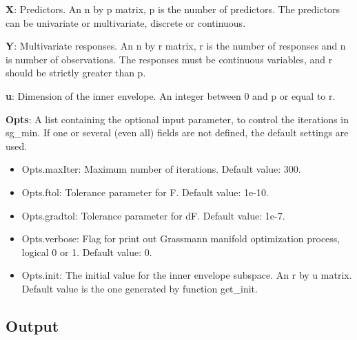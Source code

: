 \documentclass[a4paper,11pt,openany]{memoir}
\begin{document}
\begin{par}
\textbf{X}: Predictors. An n by p matrix, p is the number of predictors. The predictors can be univariate or multivariate, discrete or continuous.
\end{par} \vspace{1em}
\begin{par}
\textbf{Y}: Multivariate responses. An n by r matrix, r is the number of responses and n is number of observations. The responses must be continuous variables, and r should be strictly greater than p.
\end{par} \vspace{1em}
\begin{par}
\textbf{u}: Dimension of the inner envelope. An integer between 0 and p or equal to r.
\end{par} \vspace{1em}
\begin{par}
\textbf{Opts}: A list containing the optional input parameter, to control the iterations in sg\_min. If one or several (even all) fields are not defined, the default settings are used.
\end{par} \vspace{1em}
\begin{itemize}
\setlength{\itemsep}{-1ex}
   \item Opts.maxIter: Maximum number of iterations.  Default value: 300.
   \item Opts.ftol: Tolerance parameter for F.  Default value: 1e-10.
   \item Opts.gradtol: Tolerance parameter for dF.  Default value: 1e-7.
   \item Opts.verbose: Flag for print out Grassmann manifold optimization process, logical 0 or 1. Default value: 0.
   \item Opts.init: The initial value for the inner envelope subspace. An r by u matrix. Default value is the one generated by function get\_init.
\end{itemize}


\subsection*{Output}
\end{document}
